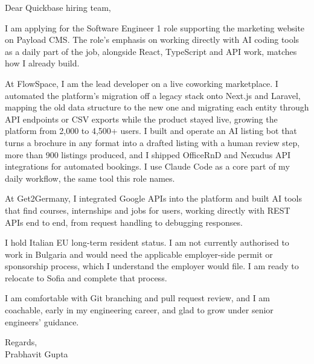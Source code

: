 \documentclass[a4paper,11pt]{article}
\begin{document}
Dear Quickbase hiring team,

I am applying for the Software Engineer 1 role supporting the marketing website on Payload CMS. The role's emphasis on working directly with AI coding tools as a daily part of the job, alongside React, TypeScript and API work, matches how I already build.

At FlowSpace, I am the lead developer on a live coworking marketplace. I automated the platform's migration off a legacy stack onto Next.js and Laravel, mapping the old data structure to the new one and migrating each entity through API endpoints or CSV exports while the product stayed live, growing the platform from 2,000 to 4,500+ users. I built and operate an AI listing bot that turns a brochure in any format into a drafted listing with a human review step, more than 900 listings produced, and I shipped OfficeRnD and Nexudus API integrations for automated bookings. I use Claude Code as a core part of my daily workflow, the same tool this role names.

At Get2Germany, I integrated Google APIs into the platform and built AI tools that find courses, internships and jobs for users, working directly with REST APIs end to end, from request handling to debugging responses.

I hold Italian EU long-term resident status. I am not currently authorised to work in Bulgaria and would need the applicable employer-side permit or sponsorship process, which I understand the employer would file. I am ready to relocate to Sofia and complete that process.

I am comfortable with Git branching and pull request review, and I am coachable, early in my engineering career, and glad to grow under senior engineers' guidance.

Regards,\\
Prabhavit Gupta
\end{document}
